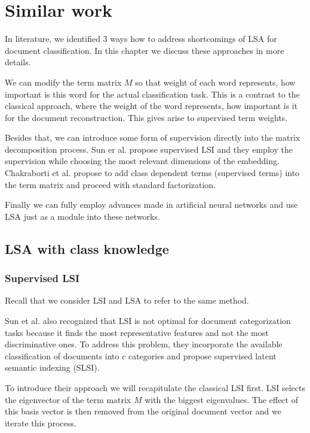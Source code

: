 \chapter{Similar work}
In literature, we identified $3$ ways how to address shortcomings of LSA for document classification. In this chapter we discuss these approaches in more details.

We can modify the term matrix $M$ so that weight of each word represents, how important is this word for the actual classification task. 
This is a contrast to the classical approach, where the weight of the word represents, how important is it for the document reconstruction.
This gives arise to supervised term weights.

Besides that, we can introduce some form of supervision directly into the matrix decomposition process.
Sun er al. \cite{sun2004supervised} propose supervised LSI and they employ the supervision while choosing the most relevant dimensions of the embedding.
Chakraborti et al. \cite{chakraborti2006sprinkling} propose to add class dependent terms (supervised terms) into the term matrix and proceed with standard factorization.

Finally we can fully employ advances made in artificial neural networks and use LSA just as a module into these networks.


\section{LSA with class knowledge} \label{sec:superwisedlsa}
    \subsection{Supervised LSI}
        Recall that we consider LSI and LSA to refer to the same method. 
    
        Sun et al. \cite{sun2004supervised} %
        also recognized that LSI is not optimal for document categorization tasks because it finds the most representative features and not the most discriminative ones. 
        To address this problem, they incorporate the available classification of documents into $c$ categories and propose supervised latent semantic indexing (SLSI).
        
        To introduce their approach we will recapitulate the classical LSI first. 
        LSI selects the eigenvector of the term matrix $M$ with the biggest eigenvalues.
        The effect of this basis vector is then removed from the original document vector and we iterate this process. 
        
